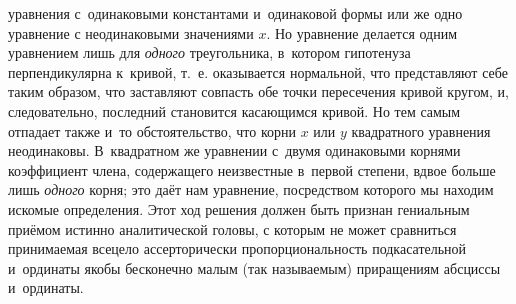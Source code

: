 уравнения с~одинаковыми константами и~одинаковой формы или же одно уравнение с
неодинаковыми значениями $x$. Но уравнение делается одним уравнением лишь для
{\em одного} треугольника, в~котором гипотенуза перпендикулярна к~кривой, т.~е.
оказывается нормальной, что представляют себе таким образом, что заставляют
совпасть обе точки пересечения кривой кругом, и, следовательно, последний
становится касающимся кривой. Но тем самым отпадает также и~то обстоятельство,
что корни $x$ или $y$ квадратного уравнения неодинаковы. В~квадратном же
уравнении с~двумя одинаковыми корнями коэффициент члена, содержащего
неизвестные в~первой степени, вдвое больше лишь {\em одного} корня; это даёт
нам уравнение, посредством которого мы находим искомые определения. Этот ход
решения должен быть признан гениальным приёмом истинно аналитической головы, с
которым не может сравниться принимаемая всецело ассерторически
пропорциональность подкасательной и~ординаты якобы бесконечно малым (так
называемым) приращениям абсциссы и~ординаты.

